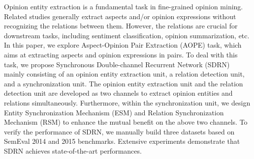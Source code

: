 Opinion entity extraction is a fundamental task in fine-grained opinion mining. Related studies generally extract aspects and/or opinion expressions without recognizing the relations between them. However, the relations are crucial for downstream tasks, including sentiment classification, opinion summarization, etc. In this paper, we explore Aspect-Opinion Pair Extraction (AOPE) task, which aims at extracting aspects and opinion expressions in pairs. To deal with this task, we propose Synchronous Double-channel Recurrent Network (SDRN) mainly consisting of an opinion entity extraction unit, a relation detection unit, and a synchronization unit. The opinion entity extraction unit and the relation detection unit are developed as two channels to extract opinion entities and relations simultaneously. Furthermore, within the synchronization unit, we design Entity Synchronization Mechanism (ESM) and Relation Synchronization Mechanism (RSM) to enhance the mutual benefit on the above two channels. To verify the performance of SDRN, we manually build three datasets based on SemEval 2014 and 2015 benchmarks. Extensive experiments demonstrate that SDRN achieves state-of-the-art performances.
